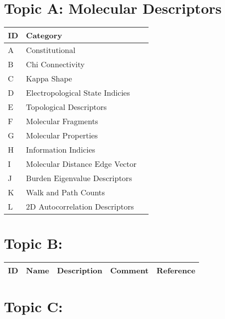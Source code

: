 
\section{Topic A: Molecular Descriptors}

\begin{table}[H]\centering
\footnotesize
\begin{tabular}{p{1cm}p{1cm}p{1cm}}
ID & Category & \\
	\hline
A & Constitutional & & \\
B & Chi Connectivity & & \\
C & Kappa Shape & & \\
D & Electropological State Indicies & & \\
E & Topological Descriptors & & \\
F & Molecular Fragments & & \\
G & Molecular Properties & & \\
H & Information Indicies & & \\
I & Molecular Distance Edge Vector &  & \\
J & Burden Eigenvalue Descriptors & & \\
K & Walk and Path Counts & & \\
L & 2D Autocorrelation Descriptors & & \\
\hline 
\hline
\end{tabular}
\end{table}

\section{Topic B:}

\begin{table}[H]\centering
\begin{tabular}{p{1cm}p{2cm}p{3cm}p{3cm}p{1cm}}
ID & Name & Description & Comment & Reference \\
\hline
\hline
\end{tabular}
\end{table}

\section{Topic C:}

